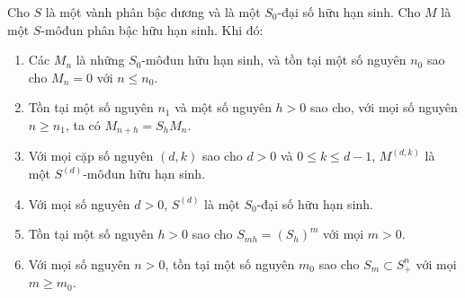 \documentclass[oneside,10pt]{amsart}
\renewcommand{\leq}{\leqslant}
\renewcommand{\geq}{\geqslant}
\let\EGAOriginalLabel\label
\renewcommand{\label}[1]{\phantomsection\EGAOriginalLabel{#1}}
\begin{document}
\begin{lemma}[2.1.6]
\label{II.2.1.6}
Cho $S$ là một vành phân bậc dương và là một $S_0$-đại số hữu hạn sinh.
Cho $M$ là một $S$-môđun phân bậc hữu hạn sinh.
Khi đó:
\begin{enumerate}
  \item[{\rm(i)}] Các $M_n$ là những $S_0$-môđun hữu hạn sinh, và tồn tại một số nguyên $n_0$ sao cho $M_n=0$ với $n\leq n_0$.
  \item[{\rm(ii)}] Tồn tại một số nguyên $n_1$ và một số nguyên $h>0$ sao cho, với mọi số nguyên $n\geq n_1$, ta có $M_{n+h}=S_hM_n$.
  \item[{\rm(iii)}] Với mọi cặp số nguyên $(d,k)$ sao cho $d>0$ và $0\leq k\leq d-1$, $M^{(d,k)}$ là một $S^{(d)}$-môđun hữu hạn sinh.
  \item[{\rm(iv)}] Với mọi số nguyên $d>0$, $S^{(d)}$ là một $S_0$-đại số hữu hạn sinh.
  \item[{\rm(v)}] Tồn tại một số nguyên $h>0$ sao cho $S_{mh}=(S_h)^m$ với mọi $m>0$.
  \item[{\rm(vi)}] Với mọi số nguyên $n>0$, tồn tại một số nguyên $m_0$ sao cho $S_m\subset S_+^n$ với mọi $m\geq m_0$.
\end{enumerate}
\end{lemma}
\end{document}
